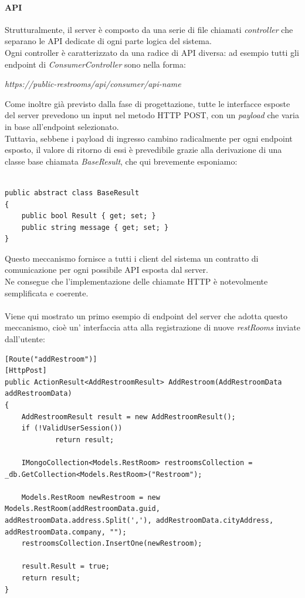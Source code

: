 \documentclass[12pt]{article}
\begin{document}
\paragraph{API}
Strutturalmente, il server è composto da una serie di file chiamati \textit{controller} che separano le API dedicate di ogni parte logica del sistema.\\
Ogni controller è caratterizzato da una radice di API diversa: ad esempio tutti gli endpoint di \textit{ConsumerController} sono nella forma:
\begin{center}
\textit{https://public-restrooms/api/consumer/api-name}
\end{center}
Come inoltre già previsto dalla fase di progettazione, tutte le interfacce esposte del server prevedono un input nel metodo HTTP POST, con un \textit{payload} che varia in base all'endpoint selezionato.\\
Tuttavia, sebbene i payload di ingresso cambino radicalmente per ogni endpoint esposto, il valore di ritorno di essi è prevedibile grazie alla derivazione di una classe base chiamata \textit{BaseResult}, che qui brevemente esponiamo:
\begin{lstlisting}

public abstract class BaseResult
{
    public bool Result { get; set; }
    public string message { get; set; }
}
\end{lstlisting}
Questo meccanismo fornisce a tutti i client del sistema un contratto di comunicazione per ogni possibile API esposta dal server.\\ 
Ne consegue che l'implementazione delle chiamate HTTP è notevolmente semplificata e coerente.\\\\
Viene qui mostrato un primo esempio di endpoint del server che adotta questo meccanismo, cioè un' interfaccia atta alla registrazione di nuove \textit{restRooms} inviate dall'utente:
\newpage
\begin{lstlisting}
[Route("addRestroom")]
[HttpPost]
public ActionResult<AddRestroomResult> AddRestroom(AddRestroomData addRestroomData)
{
    AddRestroomResult result = new AddRestroomResult();
    if (!ValidUserSession())
            return result;
        
    IMongoCollection<Models.RestRoom> restroomsCollection = _db.GetCollection<Models.RestRoom>("Restroom");
    
    Models.RestRoom newRestroom = new Models.RestRoom(addRestroomData.guid, addRestroomData.address.Split(','), addRestroomData.cityAddress, addRestroomData.company, "");
    restroomsCollection.InsertOne(newRestroom);

    result.Result = true;
    return result;    
}
\end{lstlisting}
\end{document}
